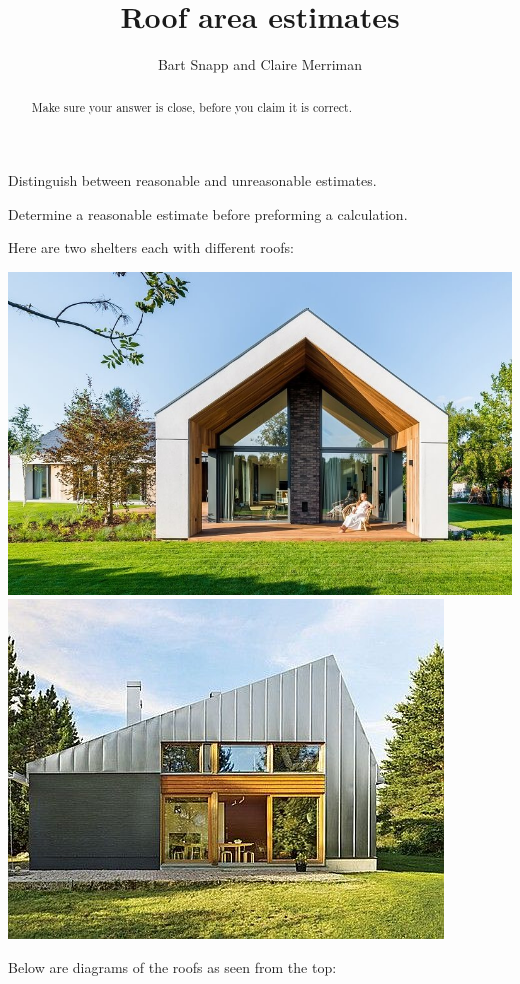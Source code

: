 \documentclass[handout,nooutcomes,noauthor,hints]{ximera}
\title{Roof area estimates}
\author{Bart Snapp and Claire Merriman}
\begin{document}
\begin{abstract}
  Make sure your answer is close, before you claim it is correct.
\end{abstract}
\maketitle

\begin{listOutcomes}
\item Distinguish between reasonable and unreasonable estimates.
\item Determine a reasonable estimate before preforming a calculation.
\end{listOutcomes}

\mynewpage
\begin{question}
Here are two shelters each with different roofs:
\begin{center}
  \includegraphics[height=.3\textwidth]{../formulasGalore/symRoof.jpg}\qquad \includegraphics[height=.3\textwidth]{../formulasGalore/skewRoof.jpg}
\end{center}
  Below are diagrams of the roofs as seen from the top:
  \begin{center}

\end{center}
\end{question}
\end{document}

